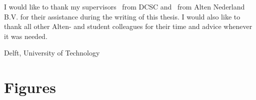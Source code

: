 \documentclass[a4paper,11pt]{mscThesis}
\begin{document}
%
\frontmatter %
%
 \maketitle
%

%
    I would like to thank my supervisors \mscreaderone\ from DCSC and \mscreadertwo\ from Alten Nederland B.V. for their assistance during the writing
    of this thesis. I would also like to thank all other Alten- and student colleagues for their time and advice whenever it was needed.
    \vspace*{15mm}

    \noindent
    Delft, University of Technology \hfill \mscname\\
    \mscdate

%
    \tocloflot
%
    
    \cleardoublepage%
%
%
\mainmatter
%
%
%







%

%


	
\appendix



\backmatter
	
	
	
	
	
	\printindex

	\printnomenclature
    \section{Figures}



\end{document}
